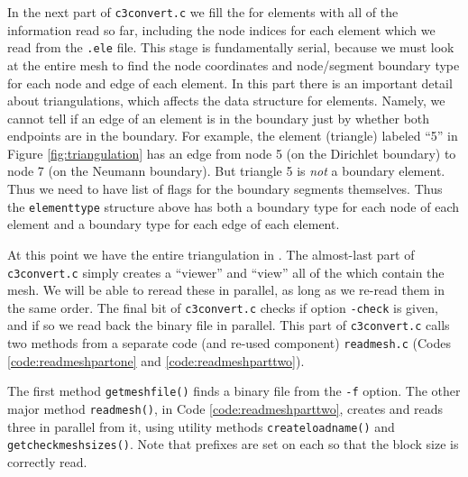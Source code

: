 In the next part of \texttt{c3convert.c} we fill the \pVec for elements with all of the information read so far, including the node indices for each element which we read from the \texttt{.ele} file.  This stage is fundamentally serial, because we must look at the entire mesh to find the node coordinates and node/segment boundary type for each node and edge of each element.  In this part there is an important detail about triangulations, which affects the data structure for elements.  Namely, we cannot tell if an edge of an element is in the boundary just by whether both endpoints are in the boundary.  For example, the element (triangle) labeled ``5'' in Figure \ref{fig:triangulation} has an edge from node 5 (on the Dirichlet boundary) to node 7 (on the Neumann boundary).  But triangle 5 is \emph{not} a boundary element.  Thus we need to have list of flags for the boundary segments themselves.  Thus the \texttt{elementtype} structure above has both a boundary type for each node of each element and a boundary type for each edge of each element.

At this point we have the entire triangulation in \PETSc \pVecs.  The almost-last part of \texttt{c3convert.c} simply creates a \PETSc ``viewer'' and ``view'' all of the \pVecs which contain the mesh.  We will be able to reread these \pVecs in parallel, as long as we re-read them in the same order.  The final bit of \texttt{c3convert.c} checks if option \texttt{-check} is given, and if so we read back the binary file in parallel.  This part of \texttt{c3convert.c} calls two methods from a separate code (and re-used component) \texttt{readmesh.c} (Codes \ref{code:readmeshpartone} and \ref{code:readmeshparttwo}).

The first method \texttt{getmeshfile()} finds a \PETSc binary file from the \texttt{-f} option.  The other major method \texttt{readmesh()}, in Code \ref{code:readmeshparttwo}, creates and reads three \pVecs in parallel from it, using utility methods \texttt{createloadname()} and \texttt{getcheckmeshsizes()}.  Note that prefixes are set on each \pVec so that the block size is correctly read.




